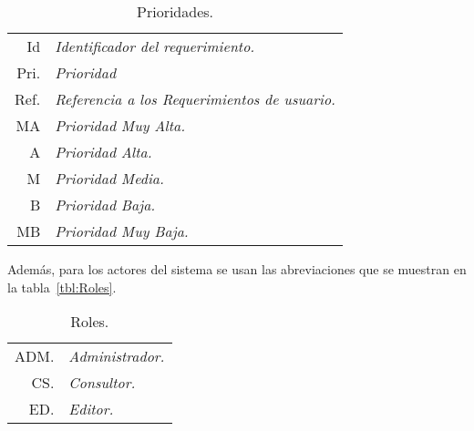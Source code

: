\begin{table}[hbtp!]
	\begin{center}
    \begin{tabular}{|r l|}
	    \hline
    	{\footnotesize Id} & {\footnotesize\em Identificador del requerimiento.}\\
    	{\footnotesize Pri.} & {\footnotesize\em Prioridad}\\
    	{\footnotesize Ref.} & {\footnotesize\em Referencia a los Requerimientos de usuario.}\\
    	{\footnotesize MA} & {\footnotesize\em Prioridad Muy Alta.}\\
    	{\footnotesize A} & {\footnotesize\em Prioridad Alta.}\\
    	{\footnotesize M} & {\footnotesize\em Prioridad Media.}\\
    	{\footnotesize B} & {\footnotesize\em Prioridad Baja.}\\
    	{\footnotesize MB} & {\footnotesize\em Prioridad Muy Baja.}\\
		\hline
    \end{tabular} 
    \caption{Prioridades.}
    \label{tbl:TbPrioridades}
	\end{center}
\end{table}
Además, para los actores del sistema se usan las abreviaciones que se muestran en la tabla~\ref{tbl:Roles}.

\begin{table}[hbtp!]
	\begin{center}
    \begin{tabular}{|r l|}
	    \hline
    	{\footnotesize ADM.} & {\footnotesize\em Administrador.}\\
    	{\footnotesize CS.} & {\footnotesize\em Consultor.}\\
    	{\footnotesize ED.} & {\footnotesize\em Editor.}\\
    	\hline
    \end{tabular} 
    \caption{Roles.}
    \label{tbl:TbRoles}
	\end{center}
\end{table}